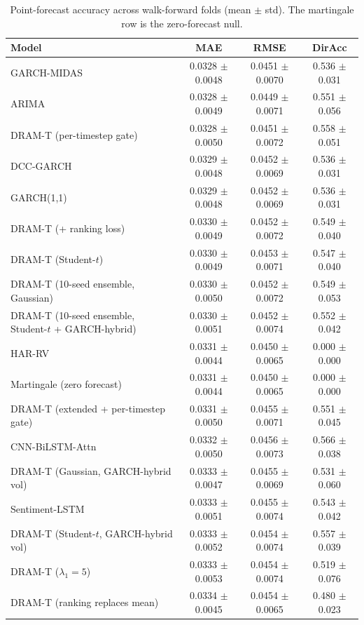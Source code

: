 \begin{table}
\caption{Point-forecast accuracy across walk-forward folds (mean $\pm$ std). The martingale row is the zero-forecast null.}
\label{tab:point}
\begin{tabular}{lccc}
\toprule
Model & MAE & RMSE & DirAcc \\
\midrule
GARCH-MIDAS & 0.0328 $\pm$ 0.0048 & 0.0451 $\pm$ 0.0070 & 0.536 $\pm$ 0.031 \\
ARIMA & 0.0328 $\pm$ 0.0049 & 0.0449 $\pm$ 0.0071 & 0.551 $\pm$ 0.056 \\
DRAM-T (per-timestep gate) & 0.0328 $\pm$ 0.0050 & 0.0451 $\pm$ 0.0072 & 0.558 $\pm$ 0.051 \\
DCC-GARCH & 0.0329 $\pm$ 0.0048 & 0.0452 $\pm$ 0.0069 & 0.536 $\pm$ 0.031 \\
GARCH(1,1) & 0.0329 $\pm$ 0.0048 & 0.0452 $\pm$ 0.0069 & 0.536 $\pm$ 0.031 \\
DRAM-T (+ ranking loss) & 0.0330 $\pm$ 0.0049 & 0.0452 $\pm$ 0.0072 & 0.549 $\pm$ 0.040 \\
DRAM-T (Student-$t$) & 0.0330 $\pm$ 0.0049 & 0.0453 $\pm$ 0.0071 & 0.547 $\pm$ 0.040 \\
DRAM-T (10-seed ensemble, Gaussian) & 0.0330 $\pm$ 0.0050 & 0.0452 $\pm$ 0.0072 & 0.549 $\pm$ 0.053 \\
DRAM-T (10-seed ensemble, Student-$t$ + GARCH-hybrid) & 0.0330 $\pm$ 0.0051 & 0.0452 $\pm$ 0.0074 & 0.552 $\pm$ 0.042 \\
HAR-RV & 0.0331 $\pm$ 0.0044 & 0.0450 $\pm$ 0.0065 & 0.000 $\pm$ 0.000 \\
Martingale (zero forecast) & 0.0331 $\pm$ 0.0044 & 0.0450 $\pm$ 0.0065 & 0.000 $\pm$ 0.000 \\
DRAM-T (extended + per-timestep gate) & 0.0331 $\pm$ 0.0050 & 0.0455 $\pm$ 0.0071 & 0.551 $\pm$ 0.045 \\
CNN-BiLSTM-Attn & 0.0332 $\pm$ 0.0050 & 0.0456 $\pm$ 0.0073 & 0.566 $\pm$ 0.038 \\
DRAM-T (Gaussian, GARCH-hybrid vol) & 0.0333 $\pm$ 0.0047 & 0.0455 $\pm$ 0.0069 & 0.531 $\pm$ 0.060 \\
Sentiment-LSTM & 0.0333 $\pm$ 0.0051 & 0.0455 $\pm$ 0.0074 & 0.543 $\pm$ 0.042 \\
DRAM-T (Student-$t$, GARCH-hybrid vol) & 0.0333 $\pm$ 0.0052 & 0.0454 $\pm$ 0.0074 & 0.557 $\pm$ 0.039 \\
DRAM-T ($\lambda_1=5$) & 0.0333 $\pm$ 0.0053 & 0.0454 $\pm$ 0.0074 & 0.519 $\pm$ 0.076 \\
DRAM-T (ranking replaces mean) & 0.0334 $\pm$ 0.0045 & 0.0454 $\pm$ 0.0065 & 0.480 $\pm$ 0.023 \\

\end{tabular}
\end{table}

